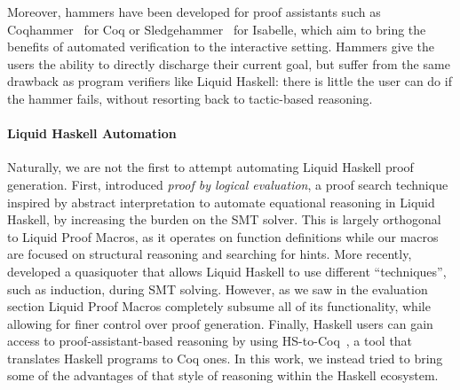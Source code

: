 Moreover, hammers have been developed for proof assistants
such as Coqhammer~\cite{CoqHammer, Coqhammer-sauto} for Coq or
Sledgehammer~\cite{Sledgehammer, SledgehammerSMT} for Isabelle, which
aim to bring the benefits of automated verification to the interactive
setting. Hammers give the users the ability to directly discharge
their current goal, but suffer from the same drawback as program
verifiers like Liquid Haskell: there is little the user can do if the
hammer fails, without resorting back to tactic-based reasoning.  
%  

\paragraph{Liquid Haskell Automation}
Naturally, we are not the first to attempt automating Liquid Haskell
proof generation.  First, \citet{VazouTCSNWJ18} introduced {\em proof
  by logical evaluation}, a proof search technique inspired by
abstract interpretation to automate equational reasoning in Liquid
Haskell, by increasing the burden on the SMT solver. This is largely
orthogonal to Liquid Proof Macros, as it operates on function
definitions while our macros are focused on structural reasoning and
searching for hints. More recently, \citet{TacticThesis} developed a
quasiquoter that allows Liquid Haskell to use different ``techniques'',
such as induction, during SMT solving. However, as we saw in the evaluation
section Liquid Proof Macros completely subsume all of its functionality,
while allowing for finer control over proof generation.
%
Finally, Haskell users can gain access to proof-assistant-based
reasoning by using HS-to-Coq~\cite{BreitnerSLRWCW21}, a tool that
translates Haskell programs to Coq ones. In this work, we instead
tried to bring some of the advantages of that style of reasoning
within the Haskell ecosystem.



%  


